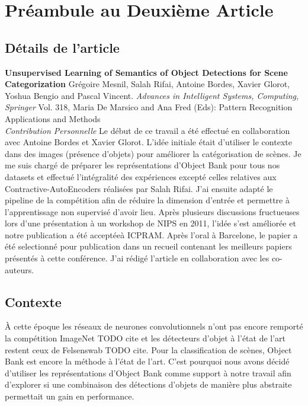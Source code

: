 \chapter{Pr\'{e}ambule au Deuxi\`{e}me Article }

\section{D\'{e}tails de l'article}

{ \bf Unsupervised Learning of Semantics of Object Detections for Scene
Categorization} Gr\'{e}goire Mesnil, Salah Rifai, Antoine Bordes, Xavier
Glorot, Yoshua Bengio and Pascal Vincent.  { \it Advances in Intelligent
Systems, Computing, Springer} Vol.  318, Maria De Marsico and Ana Fred (Eds):
Pattern Recognition Applications and Methods\\ 

{\it Contribution Personnelle} Le d\'{e}but de ce travail a \'{e}t\'{e}
effectu\'{e} en collaboration avec Antoine Bordes et Xavier Glorot. L'id\'{e}e
initiale \'{e}tait d'utiliser le contexte dans des images (pr\'{e}sence
d'objets) pour am\'{e}liorer la cat\'{e}gorisation de sc\`{e}nes. Je me suis
charg\'{e} de pr\'{e}parer les repr\'{e}sentations d'Object Bank pour tous nos
datasets et effectu\'{e} l'int\'{e}gralit\'{e} des exp\'{e}riences except\'{e}
celles relatives aux Contractive-AutoEncoders r\'{e}alis\'{e}es par Salah
Rifai. J'ai ensuite adapt\'{e} le pipeline de la comp\'{e}tition afin de
r\'{e}duire la dimension d'entr\'{e}e et permettre \`{a} l'apprentissage non
supervis\'{e} d'avoir lieu.  Apr\`{e}s plusieurs discussions fructueuses lors
d'une pr\'{e}sentation \`{a} un workshop de NIPS en 2011, l'id\'{e}e s'est
am\'{e}lior\'{e}e et notre publication a \'{e}t\'{e} accept\'{e}e\`{a} ICPRAM.
Apr\`{e}s l'oral \`{a} Barcelone, le papier a \'{e}t\'{e} selectionn\'{e} pour
publication dans un recueil contenant les meilleurs papiers pr\'{e}sent\'{e}s
\`{a} cette conf\'{e}rence. J'ai r\'{e}dig\'{e} l'article en collaboration avec
les co-auteurs.

\section{Contexte}

\`{A} cette \'{e}poque les r\'{e}seaux de neurones convolutionnels n'ont pas
encore remport\'{e} la comp\'{e}tition ImageNet TODO cite et les d\'{e}tecteurs d'objet
\`{a} l'\'{e}tat de l'art restent ceux de Felsenswab TODO cite. Pour la
classification de sc\`{e}nes, Object Bank est encore la m\'{e}thode \`{a}
l'\'{e}tat de l'art.  C'est pourquoi nous avons d\'{e}cid\'{e} d'utiliser les
repr\'{e}sentations d'Object Bank comme support \`{a} notre travail afin
d'explorer si une combinaison des d\'{e}tections d'objets de mani\`{e}re plus
abstraite permettait un gain en performance.

